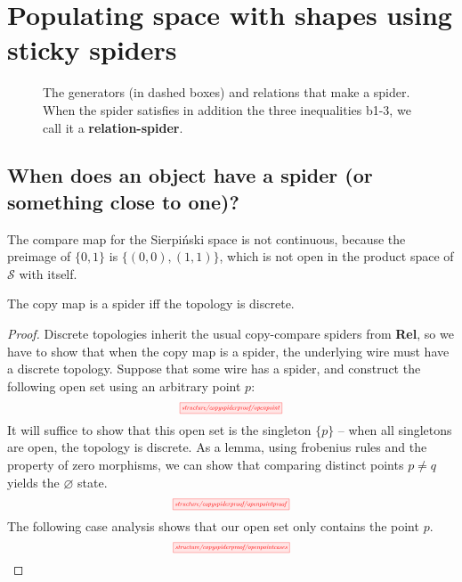 \section{Populating space with shapes using sticky spiders}

\begin{figure}\label{fig:spiderbicate}
\caption{The generators (in dashed boxes) and relations that make a spider. When the spider satisfies in addition the three inequalities b1-3, we call it a \textbf{relation-spider}.}
\end{figure}

\subsection{When does an object have a spider (or something close to one)?}


\begin{example}\label{ex:compnotspider}
The compare map for the Sierpi\'{n}ski space is not continuous, because the preimage of $\{0,1\}$ is $\{(0,0),(1,1)\}$, which is not open in the product space of $\mathcal{S}$ with itself.
\end{example}

\begin{proposition}\label{prop:copydiscrete}
The copy map is a spider iff the topology is discrete.
\begin{proof}
Discrete topologies inherit the usual copy-compare spiders from \textbf{Rel}, so we have to show that when the copy map is a spider, the underlying wire must have a discrete topology. Suppose that some wire has a spider, and construct the following open set using an arbitrary point $p$:
\[\scalebox{0.5}{\tikzfig{structure/copyspiderproof/openpoint}}\]
It will suffice to show that this open set is the singleton $\{p\}$ -- when all singletons are open, the topology is discrete. As a lemma, using frobenius rules and the property of zero morphisms, we can show that comparing distinct points $p \neq q$ yields the $\varnothing$ state.
\[\scalebox{0.5}{\tikzfig{structure/copyspiderproof/openpointproof}}\]
The following case analysis shows that our open set only contains the point $p$.
\[\scalebox{0.5}{\tikzfig{structure/copyspiderproof/openpointcases}}\]
\end{proof}
\end{proposition}


